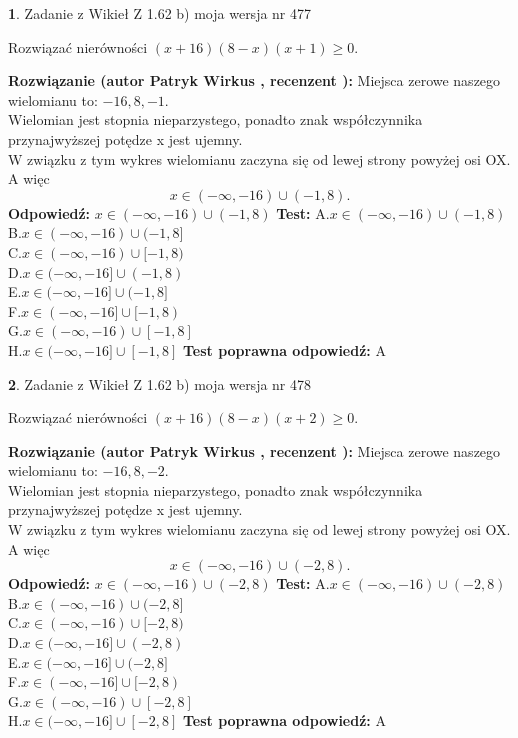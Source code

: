 \documentclass[12pt, a4paper]{article}
\theoremstyle{definition} %
\newtheorem{zad}{}
\newcommand{\zadStart}[1]{\begin{zad}#1\newline}
\newcommand{\zadStop}{\end{zad}}
\newcommand{\rozwStart}[2]{\noindent \textbf{Rozwiązanie (autor #1 , recenzent #2): }\newline}
\newcommand{\rozwStop}{\newline}
\newcommand{\odpStart}{\noindent \textbf{Odpowiedź:}\newline}
\newcommand{\odpStop}{\newline}
\newcommand{\testStart}{\noindent \textbf{Test:}\newline}
\newcommand{\testStop}{\newline}
\newcommand{\kluczStart}{\noindent \textbf{Test poprawna odpowiedź:}\newline}
\newcommand{\kluczStop}{\newline}
\begin{document}
\zadStart{Zadanie z Wikieł Z 1.62 b) moja wersja nr 477}

Rozwiązać nierówności $(x+16)(8-x)(x+1)\ge0$.
\zadStop
\rozwStart{Patryk Wirkus}{}
Miejsca zerowe naszego wielomianu to: $-16, 8, -1$.\\
Wielomian jest stopnia nieparzystego, ponadto znak współczynnika przy\linebreak najwyższej potędze x jest ujemny.\\ W związku z tym wykres wielomianu zaczyna się od lewej strony powyżej osi OX. A więc $$x \in (-\infty,-16) \cup (-1,8).$$
\rozwStop
\odpStart
$x \in (-\infty,-16) \cup (-1,8)$
\odpStop
\testStart
A.$x \in (-\infty,-16) \cup (-1,8)$\\
B.$x \in (-\infty,-16) \cup (-1,8]$\\
C.$x \in (-\infty,-16) \cup [-1,8)$\\
D.$x \in (-\infty,-16] \cup (-1,8)$\\
E.$x \in (-\infty,-16] \cup (-1,8]$\\
F.$x \in (-\infty,-16] \cup [-1,8)$\\
G.$x \in (-\infty,-16) \cup [-1,8]$\\
H.$x \in (-\infty,-16] \cup [-1,8]$
\testStop
\kluczStart
A
\kluczStop



\zadStart{Zadanie z Wikieł Z 1.62 b) moja wersja nr 478}

Rozwiązać nierówności $(x+16)(8-x)(x+2)\ge0$.
\zadStop
\rozwStart{Patryk Wirkus}{}
Miejsca zerowe naszego wielomianu to: $-16, 8, -2$.\\
Wielomian jest stopnia nieparzystego, ponadto znak współczynnika przy\linebreak najwyższej potędze x jest ujemny.\\ W związku z tym wykres wielomianu zaczyna się od lewej strony powyżej osi OX. A więc $$x \in (-\infty,-16) \cup (-2,8).$$
\rozwStop
\odpStart
$x \in (-\infty,-16) \cup (-2,8)$
\odpStop
\testStart
A.$x \in (-\infty,-16) \cup (-2,8)$\\
B.$x \in (-\infty,-16) \cup (-2,8]$\\
C.$x \in (-\infty,-16) \cup [-2,8)$\\
D.$x \in (-\infty,-16] \cup (-2,8)$\\
E.$x \in (-\infty,-16] \cup (-2,8]$\\
F.$x \in (-\infty,-16] \cup [-2,8)$\\
G.$x \in (-\infty,-16) \cup [-2,8]$\\
H.$x \in (-\infty,-16] \cup [-2,8]$
\testStop
\kluczStart
A
\kluczStop
\end{document}
